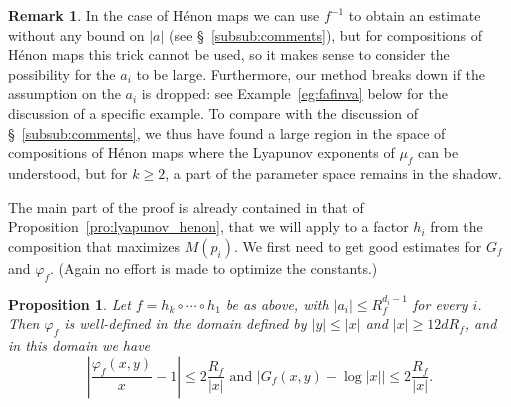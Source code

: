 \documentclass[oneside, 12pt]{amsart}
\newcommand{\norm}[1]{{\left\Vert#1\right\Vert}}
\newcommand{\abs}[1]{\left\vert#1\right\vert}
\newcommand{\inv}{^{-1}}
\theoremstyle{plain}
\newtheorem{pro}[thm]{Proposition}
\theoremstyle{definition}
\newtheorem{rem}[thm]{Remark}
\numberwithin{equation}{section}       %
\numberwithin{equation}{section}       %
\begin{document}
\begin{rem} 
In the case of Hénon maps we can use $f\inv$ to obtain 
an estimate without any bound on $\abs{a}$ 
(see \S~\ref{subsub:comments}), but for compositions of Hénon maps 
this trick cannot be used,  so it 
makes sense to consider the possibility for the  $a_i$ to be large. Furthermore,  
our method breaks down if the assumption on the   $a_i$ is dropped: see 
Example~\ref{eg:fafinva} below for the discussion of a specific example.  
To compare with the discussion of \S~\ref{subsub:comments}, we thus have found 
 a large region in the space of compositions of Hénon maps where the Lyapunov exponents of $\mu_f$ can be understood, but for $k\geq 2$, 
a part of the parameter space remains in the shadow. 
\end{rem}

The main part of the proof is already contained in that of 
Proposition~\ref{pro:lyapunov_henon}, that  we will apply to a factor $h_i$ from the composition that maximizes $M(p_i)$. 
We first need to get good  estimates for $G_f$ and $\varphi_f$. 
(Again no effort is made   to optimize the constants.)

\begin{pro}\label{pro:estimate_varphi_multi}
Let $f = h_k\circ \cdots \circ h_1$ be as above, with $\abs{a_i}\leq R_f^{d_i-1}$ for every $i$. Then $\varphi_f$ is well-defined in the domain defined by  $\abs{y}\leq \abs{x}$ and $\abs{x}\geq  12d R_f$,  and in this domain we have
  $$\abs{\frac{\varphi_f(x,y)}{x} - 1} \leq   2 \frac{R_f}{  \abs{x}} \text{ and } \abs{G_f(x,y) - \log \abs{x}}\leq     2  \frac{R_f}{\abs{x}} .$$
\end{pro}

 
\end{document}
